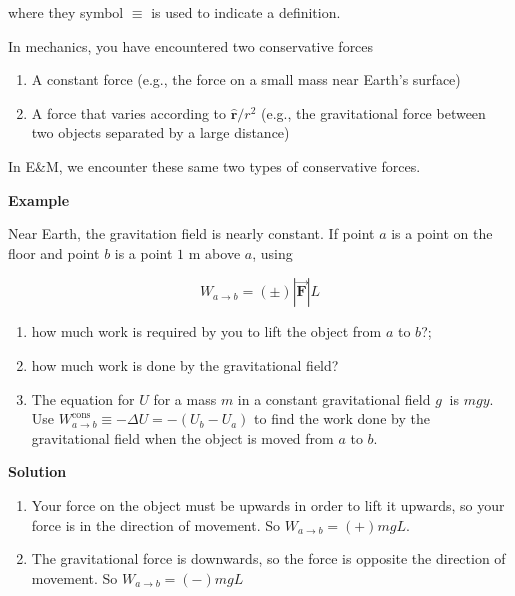 \documentclass{article}
\newcommand{\rhat}[0]{\hat{\mathbf{r}}}
\newcommand{\bfvec}[1]{\vec{\mathbf{#1}}}
\begin{document}
where they symbol $\equiv$ is used to indicate a definition.

In mechanics, you have encountered two conservative forces

\begin{enumerate}

  \item A constant force (e.g., the force on a small mass near Earth's surface)

  \item A force that varies according to $\rhat/r^2$ (e.g., the gravitational force between two objects separated by a large distance)

\end{enumerate}

In E&M, we encounter these same two types of conservative forces.

\textbf{Example}

Near Earth, the gravitation field is nearly constant. If point $a$ is a point on the floor and point $b$ is a point $1\text{ m}$ above $a$, using

\begin{equation}
W_{a\rightarrow b}=(\pm)|\bfvec{F}|L
\end{equation}

\begin{enumerate}

  \item how much work is required by you to lift the object from $a$ to $b$?;

  \item how much work is done by the gravitational field?

  \item The equation for $U$ for a mass $m$ in a constant gravitational field $g~$ is $mgy$. Use $W_{a\rightarrow b}^{\text{cons}} \equiv -\Delta U = -(U_b-U_a)$ to find the work done by the gravitational field when the object is moved from $a$ to $b$.

\end{enumerate}

\textbf{Solution}

\begin{enumerate}

  \item Your force on the object must be upwards in order to lift it upwards, so your force is in the direction of movement. So $W_{a\rightarrow b}=(+)mgL$.

  \item The gravitational force is downwards, so the force is opposite the direction of movement. So $W_{a\rightarrow b}=(-)mgL$

\end{enumerate}
\end{document}
